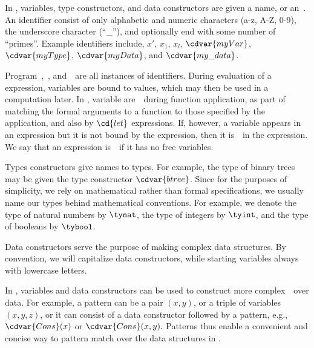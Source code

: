 \begin{cluster}
\label{grp:grm:sparc::identifiers}

\begin{gram}[Identifiers]
\label{grm:sparc::identifiers}
In \pml, variables, type constructors, and data constructors are given
a name, or an~.  
An identifier consist of only alphabetic and numeric characters (a-z,
A-Z, 0-9), the underscore character (``\_''), and optionally end with
some number of ``primes''.  
Example identifiers include, $x'$, $x_1$, $x_l$, $\cdvar{myVar}$,
$\cdvar{myType}$, $\cdvar{myData}$, and $\cdvar{my\_data}$.



Program~,~, and~~are all instances of identifiers.
During evaluation of a \pml expression, variables are bound to values,
which may then be used in  a computation later.  
In \pml, variable are~~during function application, as part
of matching the formal arguments to a function to those specified by
the application, and also by $\cd{let}$ expressions.
If, however, a variable appears in an expression but it is not bound
by the expression, then it is~~in the expression.
We say that an expression is~~if it
has no free variables.


Types constructors give names to types.  For example, the type of
binary trees may be given the type constructor $\cdvar{btree}$.
Since for the purposes of simplicity, we rely on mathematical rather
than formal specifications, we usually name our types behind
mathematical conventions.
For example, we denote the type of natural numbers by $\tynat$, the type
of integers by $\tyint$, and the type of booleans by $\tybool$.


Data constructors serve the purpose of making complex data structures.
By convention, we will capitalize data constructors, while starting
variables always with lowercase letters.

\end{gram}
\end{cluster}

\begin{cluster}
\label{grp:grm:sparc::patterns}

\begin{gram}[Patterns]
\label{grm:sparc::patterns}
In \pml, variables and data constructors can be used to construct more
complex~~over data.
For example, a pattern can be a pair $(x,y)$, or a triple of
variables $(x,y,z)$, or it can consist of a data constructor
followed by a pattern, e.g., $\cdvar{Cons}(x)$ or $\cdvar{Cons}(x,y).$
Patterns thus enable a convenient and concise way to pattern match
over the data structures in \pml.

\end{gram}
\end{cluster}

